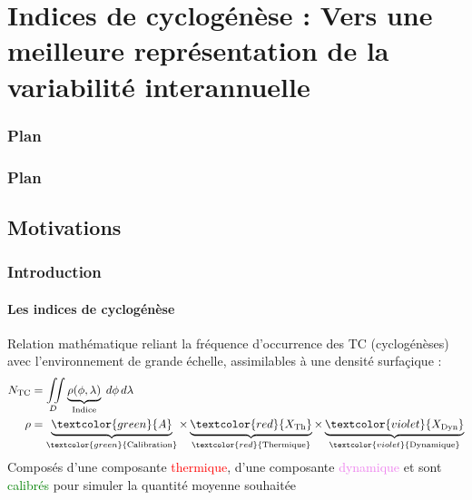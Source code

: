 \documentclass[aspectratio=169, usepdftitle=false, xcolor={dvipsnames}, 9pt,table]{beamer}
\begin{document}
\section[Indices de cyclogénèse]{Indices de cyclogénèse : Vers une meilleure représentation de la variabilité interannuelle}
\begin{frame}[c]
    \frametitle{Plan}
    \addtocounter{framesinsection}{-1}
    \tableofcontents[currentsection,hideallsubsections,sections={1-3}]
    \vspace{-3em}
    \tableofcontents[hideallsubsections,sections={4-}]
\end{frame}
%
\begin{frame}[c]
    \frametitle{Plan}
    \addtocounter{framesinsection}{-1}
\end{frame}

\makesecslide

\subsection*{Motivations}
\begin{frame}[t]
    \frametitle{Introduction}
    \framesubtitle{Les indices de cyclogénèse}
    \small
    \begin{definition}[Définition]
        Relation mathématique reliant la fréquence d'occurrence des TC (cyclogénèses) avec l'environnement de grande échelle, assimilables à une densité
        surfaçique :
        \begin{align*}
            N_{\text{TC}} &= \iint\limits_{D} \underbrace{\rho(\phi, \lambda)}_{\text{Indice}} \; d\phi \, d\lambda \\
            \rho &= \underbrace{\vphantom{X_{\text{Dyn}}}\textcolor{green}{A}}_{\textcolor{green}{\text{Calibration}}} \times
            \underbrace{\vphantom{X_{\text{Dyn}}}\textcolor{red}{X_{\text{Th}}}}_{\textcolor{red}{\text{Thermique}}} \times
            \underbrace{\textcolor{violet}{X_{\text{Dyn}}}}_{\textcolor{violet}{\text{Dynamique}}}
        \end{align*}
        Composés d'une composante \textcolor{red}{thermique}, d'une composante \textcolor{violet}{dynamique} et sont \textcolor{green}{calibrés} pour simuler la
        quantité moyenne souhaitée 
    \end{definition}
    \vspace{1em}
\end{frame}
\end{document}
